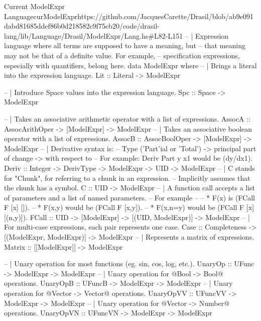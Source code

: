 \begin{haskell}{Current ModelExpr Language}{curModelExpr}{https://github.com/JacquesCarette/Drasil/blob/ab9e091dabd81685ddef86b0d218582c9f75cb20/code/drasil-lang/lib/Language/Drasil/ModelExpr/Lang.hs\#L82-L151}
-- | Expression language where all terms are supposed to have a meaning, but
--   that meaning may not be that of a definite value. For example,
--   specification expressions, especially with quantifiers, belong here.
data ModelExpr where
  -- | Brings a literal into the expression language.
  Lit       :: Literal -> ModelExpr
  
  -- | Introduce Space values into the expression language.
  Spc       :: Space -> ModelExpr
  
  -- | Takes an associative arithmetic operator with a list of expressions.
  AssocA    :: AssocArithOper -> [ModelExpr] -> ModelExpr
  -- | Takes an associative boolean operator with a list of expressions.
  AssocB    :: AssocBoolOper  -> [ModelExpr] -> ModelExpr
  -- | Derivative syntax is:
  --   Type ('Part'ial or 'Total') -> principal part of change -> with respect to
  --   For example: Deriv Part y x1 would be (dy/dx1).
  Deriv     :: Integer -> DerivType -> ModelExpr -> UID -> ModelExpr
  -- | C stands for "Chunk", for referring to a chunk in an expression.
  --   Implicitly assumes that the chunk has a symbol.
  C         :: UID -> ModelExpr
  -- | A function call accepts a list of parameters and a list of named parameters.
  --   For example
  --
  --   * F(x) is (FCall F [x] []).
  --   * F(x,y) would be (FCall F [x,y]).
  --   * F(x,n=y) would be (FCall F [x] [(n,y)]).
  FCall     :: UID -> [ModelExpr] -> [(UID, ModelExpr)] -> ModelExpr
  -- | For multi-case expressions, each pair represents one case.
  Case      :: Completeness -> [(ModelExpr, ModelExpr)] -> ModelExpr
  -- | Represents a matrix of expressions.
  Matrix    :: [[ModelExpr]] -> ModelExpr
  
  -- | Unary operation for most functions (eg. sin, cos, log, etc.).
  UnaryOp       :: UFunc -> ModelExpr -> ModelExpr
  -- | Unary operation for @Bool -> Bool@ operations.
  UnaryOpB      :: UFuncB -> ModelExpr -> ModelExpr
  -- | Unary operation for @Vector -> Vector@ operations.
  UnaryOpVV     :: UFuncVV -> ModelExpr -> ModelExpr
  -- | Unary operation for @Vector -> Number@ operations.
  UnaryOpVN     :: UFuncVN -> ModelExpr -> ModelExpr
  

\end{haskell}
